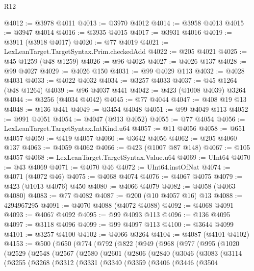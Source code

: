 \begin{lexlean}{R12}
\begin{coremodule}
{{{{{{{{{{{{{{{{{{{{{{{{{{{{{{{{{{{{{{{{{{{{{{{{{{{{{{{{{{{{{{{{{{{{{{{{{{{{{{{{{{{{{{{{{{{{{{{{{{{{{{{{{{@4012 := @3978 @4011
@4013 := @3970 @4012
@4014 := @3958 @4013
@4015 := @3947 @4014
@4016 := @3935 @4015
@4017 := @3931 @4016
@4019 := @3911 (@3918 @4017)
@4020 := @77 @4019
@4021 := LexLeanTarget.TargetSyntax.Prim.checkedAdd
@4022 := @205 @4021
@4025 := @45 @1259 (@48 @1259)
@4026 := @96 @4025
@4027 := @4026 @137
@4028 := @99 @4027
@4029 := @4026 @150
@4031 := @99 @4029 @113
@4032 := @4028 @4031
@4033 := @4022 @4032
@4034 := @3257 @4033
@4037 := @45 @1264 (@48 @1264)
@4039 := @96 @4037 @441
@4042 := @423 (@1008 @4039) @3264
@4044 := @3256 (@4034 @4042)
@4045 := @77 @4044
@4047 := @408 @19 @13
@4048 := @136 @441
@4049 := @3454 @4048
@4051 := @99 @4049 @113
@4052 := @991 @4051
@4054 := @4047 (@913 @4052)
@4055 := @77 @4054
@4056 := LexLeanTarget.TargetSyntax.IntKind.u64
@4057 := @11 @4056
@4058 := @651 @4057
@4059 := @419 @4057
@4060 := @3642 @4056
@4062 := @205 @4060 @137
@4063 := @4059 @4062
@4066 := @423 (@1007 @87 @148)
@4067 := @105 @4057
@4068 := LexLeanTarget.TargetSyntax.Value.u64
@4069 := UInt64
@4070 := @43 @4069
@4071 := @4070 @46
@4072 := UInt64.instOfNat
@4074 := @4071 (@4072 @46)
@4075 := @4068 @4074
@4076 := @4067 @4075
@4079 := @423 (@1013 @4076) @450
@4080 := @4066 @4079
@4082 := @4058 (@4063 @4080)
@4083 := @77 @4082
@4087 := @200 (@10 @4057 @16) @13
@4088 := 4294967295
@4091 := @4070 @4088 (@4072 @4088)
@4092 := @4068 @4091
@4093 := @4067 @4092
@4095 := @99 @4093 @113
@4096 := @136 @4095
@4097 := @3118 @4096
@4099 := @99 @4097 @113
@4100 := @3644 @4099
@4101 := @3257 @4100
@4102 := @4066 @3264
@4104 := @4087 (@4101 @4102)
@4153 := @500
    (@650
      (@774
        (@792
          (@822
            (@949
              (@968
                (@977
                  (@995
                    (@1020
                      (@2529
                        (@2548
                          (@2567
                            (@2580
                              (@2601
                                (@2806
                                  (@2840
                                    (@3046
                                      (@3083
                                        (@3114
                                          (@3255
                                            (@3268
                                              (@3312
                                                (@3331
                                                  (@3340
                                                    (@3359
                                                      (@3406
                                                        (@3446
                                                          (@3504
}}}}}}}}}}}}}}}}}}}}}}}}}}}}}}}}}}}}}}}}}}}}}}}}}}}}}}}}}}}}}}}}}}}}}}}}}}}}}}}}}}}}}}}}}}}}}}}}}}}}}}}}}}
\end{coremodule}
\end{lexlean}
